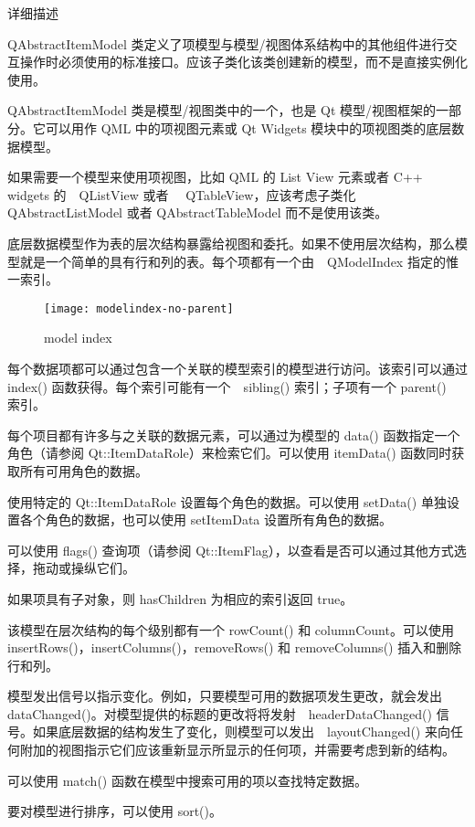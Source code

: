 详细描述

\splitLine

QAbstractItemModel 类定义了项模型与模型/视图体系结构中的其他组件进行交互操作时必须使用的标准接口。应该子类化该类创建新的模型，而不是直接实例化使用。

QAbstractItemModel 类是模型/视图类中的一个，也是 Qt 模型/视图框架的一部分。它可以用作 QML 中的项视图元素或 Qt Widgets 模块中的项视图类的底层数据模型。

如果需要一个模型来使用项视图，比如 QML 的 List View 元素或者 C++ widgets 的　QListView 或者　 QTableView，应该考虑子类化 QAbstractListModel 或者 QAbstractTableModel 而不是使用该类。

底层数据模型作为表的层次结构暴露给视图和委托。如果不使用层次结构，那么模型就是一个简单的具有行和列的表。每个项都有一个由　QModelIndex 指定的惟一索引。

\begin{figure}[hbt!]  
	\centering
    \texttt{[image: modelindex-no-parent]}
	\caption{model index}
\end{figure}

每个数据项都可以通过包含一个关联的模型索引的模型进行访问。该索引可以通过　index() 函数获得。每个索引可能有一个　sibling() 索引；子项有一个 parent()　索引。

每个项目都有许多与之关联的数据元素，可以通过为模型的 data() 函数指定一个角色（请参阅 Qt::ItemDataRole）来检索它们。可以使用 itemData() 函数同时获取所有可用角色的数据。

使用特定的 Qt::ItemDataRole 设置每个角色的数据。可以使用 setData() 单独设置各个角色的数据，也可以使用 setItemData 设置所有角色的数据。

可以使用 flags() 查询项（请参阅 Qt::ItemFlag），以查看是否可以通过其他方式选择，拖动或操纵它们。

如果项具有子对象，则 hasChildren 为相应的索引返回 true。

该模型在层次结构的每个级别都有一个 rowCount() 和 columnCount。可以使用 insertRows()，insertColumns()，removeRows() 和 removeColumns() 插入和删除行和列。

模型发出信号以指示变化。例如，只要模型可用的数据项发生更改，就会发出 dataChanged()。对模型提供的标题的更改将将发射　headerDataChanged() 信号。如果底层数据的结构发生了变化，则模型可以发出　layoutChanged() 来向任何附加的视图指示它们应该重新显示所显示的任何项，并需要考虑到新的结构。

可以使用 match() 函数在模型中搜索可用的项以查找特定数据。

要对模型进行排序，可以使用 sort()。

